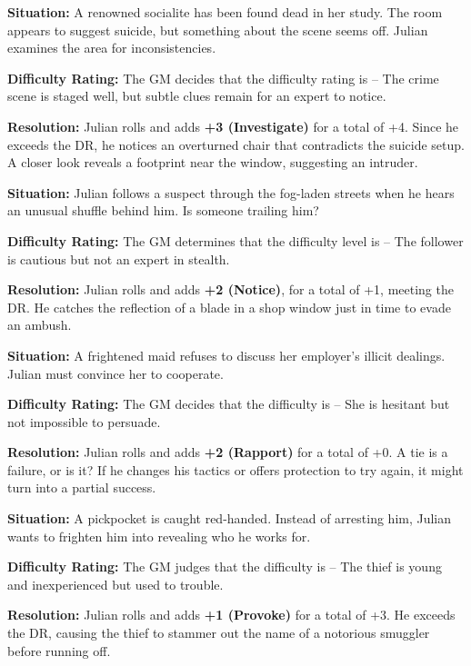\begin{WyrdExample}
	\textbf{Situation:} A renowned socialite has been found dead in her study. The room appears to suggest suicide, but something about the scene seems off. Julian examines the area for inconsistencies.

	\noindent
	\textbf{Difficulty Rating:} The GM decides that the difficulty rating is \Formidable – The crime scene is staged well, but subtle clues remain for an expert to notice.

	\noindent
	\textbf{Resolution:} Julian rolls  and adds \textbf{+3 (Investigate)} for a total of +4. Since he exceeds the DR, he notices an overturned chair that contradicts the suicide setup. A closer look reveals a footprint near the window, suggesting an intruder.
\end{WyrdExample}


\begin{WyrdExample}
	\textbf{Situation:} Julian follows a suspect through the fog-laden streets when he hears an unusual shuffle behind him. Is someone trailing him?

	\noindent\textbf{Difficulty Rating:} The GM determines that the difficulty level is \Difficult – The follower is cautious but not an expert in stealth.

	\noindent\textbf{Resolution:} Julian rolls  and adds  \textbf{+2 (Notice)}, for a total of +1, meeting the DR. He catches the reflection of a blade in a shop window just in time to evade an ambush.
\end{WyrdExample}


\begin{WyrdExample}
	\textbf{Situation:} A frightened maid refuses to discuss her employer’s illicit dealings. Julian must convince her to cooperate.

	\noindent\textbf{Difficulty Rating:} The GM decides that the difficulty is \Challenging – She is hesitant but not impossible to persuade.

	\noindent\textbf{Resolution:} Julian rolls \FudgeRes{+---} and adds \textbf{+2 (Rapport)} for a total of +0. A tie is a failure, or is it? If he changes his tactics or offers protection to try again, it might turn into a partial success.
\end{WyrdExample}


\begin{WyrdExample}
	\textbf{Situation:} A pickpocket is caught red-handed. Instead of arresting him, Julian wants to frighten him into revealing who he works for.

	\noindent\textbf{Difficulty Rating:} The GM judges that the difficulty is \Basic – The thief is young and inexperienced but used to trouble.

	\noindent\textbf{Resolution:} Julian rolls  and adds \textbf{+1 (Provoke)} for a total of +3. He exceeds the DR, causing the thief to stammer out the name of a notorious smuggler before running off.
\end{WyrdExample}


